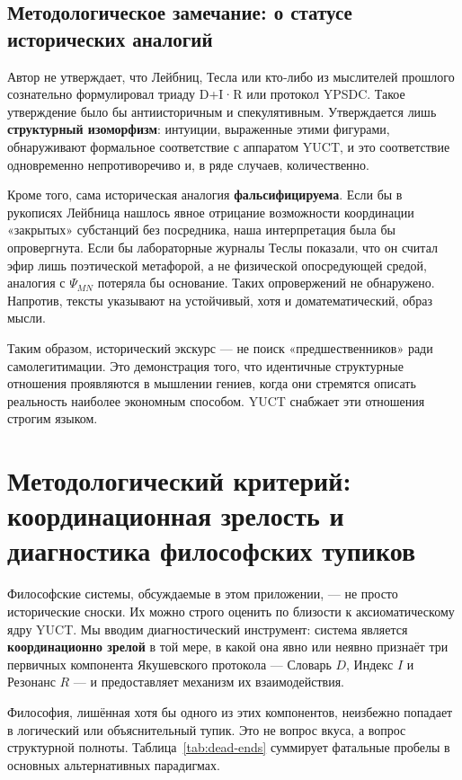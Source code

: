 \documentclass[12pt,a4paper]{article}
\begin{document}
	\subsection{Методологическое замечание: о статусе исторических аналогий}
	\label{subsec:methodological-note}
	
	Автор не утверждает, что Лейбниц, Тесла или кто‑либо из мыслителей прошлого сознательно формулировал триаду D+I·R или протокол YPSDC. Такое утверждение было бы антиисторичным и спекулятивным. Утверждается лишь \textbf{структурный изоморфизм}: интуиции, выраженные этими фигурами, обнаруживают формальное соответствие с аппаратом YUCT, и это соответствие одновременно непротиворечиво и, в ряде случаев, количественно.
	
	Кроме того, сама историческая аналогия \textbf{фальсифицируема}. Если бы в рукописях Лейбница нашлось явное отрицание возможности координации «закрытых» субстанций без посредника, наша интерпретация была бы опровергнута. Если бы лабораторные журналы Теслы показали, что он считал эфир лишь поэтической метафорой, а не физической опосредующей средой, аналогия с \(\Psi_{MN}\) потеряла бы основание. Таких опровержений не обнаружено. Напротив, тексты указывают на устойчивый, хотя и доматематический, образ мысли.
	
	Таким образом, исторический экскурс — не поиск «предшественников» ради самолегитимации. Это демонстрация того, что идентичные структурные отношения проявляются в мышлении гениев, когда они стремятся описать реальность наиболее экономным способом. YUCT снабжает эти отношения строгим языком.
	
	\section{Методологический критерий: координационная зрелость и диагностика философских тупиков}
	\label{sec:methodological-criterion}
	
	Философские системы, обсуждаемые в этом приложении, — не просто исторические сноски. Их можно строго оценить по близости к аксиоматическому ядру YUCT. Мы вводим диагностический инструмент: система является \textbf{координационно зрелой} в той мере, в какой она явно или неявно признаёт три первичных компонента Якушевского протокола — Словарь \(D\), Индекс \(I\) и Резонанс \(R\) — и предоставляет механизм их взаимодействия.
	
	Философия, лишённая хотя бы одного из этих компонентов, неизбежно попадает в логический или объяснительный тупик. Это не вопрос вкуса, а вопрос структурной полноты. Таблица~\ref{tab:dead-ends} суммирует фатальные пробелы в основных альтернативных парадигмах.
	
\end{document}
